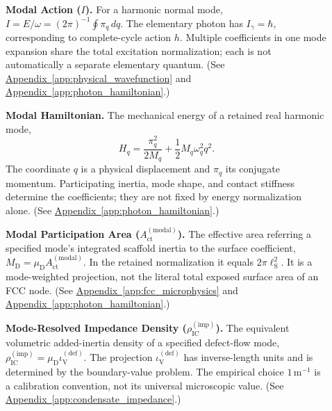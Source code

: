 \begin{description}
\item[] \begin{minipage}[t]{\linewidth}
\textbf{Modal Action ($I$).} For a harmonic normal mode, $I=E/\omega=(2\pi)^{-1}\oint\pi_q\,dq$. The elementary photon has $I_\gamma=\hbar$, corresponding to complete-cycle action $h$. Multiple coefficients in one mode expansion share the total excitation normalization; each is not automatically a separate elementary quantum.
(See \hyperref[app:physical_wavefunction]{Appendix~\ref*{app:physical_wavefunction}} and \hyperref[app:photon_hamiltonian]{Appendix~\ref*{app:photon_hamiltonian}}.)
\end{minipage}

\item[] \begin{minipage}[t]{\linewidth}
\textbf{Modal Hamiltonian.} The mechanical energy of a retained real harmonic mode,
\[
 H_q=\frac{\pi_q^2}{2M_q}
       +\frac12M_q\omega_q^2q^2.
\]
The coordinate $q$ is a physical displacement and $\pi_q$ its conjugate momentum. Participating inertia, mode shape, and contact stiffness determine the coefficients; they are not fixed by energy normalization alone.
(See \hyperref[app:photon_hamiltonian]{Appendix~\ref*{app:photon_hamiltonian}}.)
\end{minipage}

\item[] \begin{minipage}[t]{\linewidth}
\textbf{Modal Participation Area ($A_{\mathrm{ct}}^{(\mathrm{modal})}$).} The effective area referring a specified mode's integrated scaffold inertia to the surface coefficient, $M_{\mathrm D}=\mu_{\mathrm D}A_{\mathrm{ct}}^{(\mathrm{modal})}$. In the retained normalization it equals $2\pi\ell_{\mathrm S}^2$. It is a mode-weighted projection, not the literal total exposed surface area of an FCC node.
(See \hyperref[app:fcc_microphysics]{Appendix~\ref*{app:fcc_microphysics}} and \hyperref[app:photon_hamiltonian]{Appendix~\ref*{app:photon_hamiltonian}}.)
\end{minipage}

\item[] \begin{minipage}[t]{\linewidth}
\textbf{Mode-Resolved Impedance Density ($\rho_{\mathrm{IC}}^{(\mathrm{imp})}$).} The equivalent volumetric added-inertia density of a specified defect-flow mode, $\rho_{\mathrm{IC}}^{(\mathrm{imp})}=\mu_{\mathrm D}\iota_{\mathrm V}^{(\mathrm{def})}$. The projection $\iota_{\mathrm V}^{(\mathrm{def})}$ has inverse-length units and is determined by the boundary-value problem. The empirical choice $1\,\mathrm{m^{-1}}$ is a calibration convention, not its universal microscopic value.
(See \hyperref[app:condensate_impedance]{Appendix~\ref*{app:condensate_impedance}}.)
\end{minipage}


\end{description}
